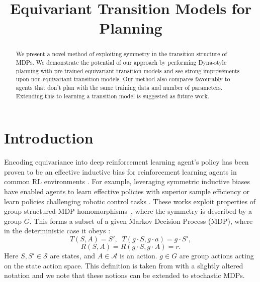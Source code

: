 \documentclass[mlabstract]{jmlr}
\title[Equivariant Planning]{Equivariant Transition Models for Planning}
\begin{document}
\maketitle

\begin{abstract}
	We present a novel method of exploiting symmetry in the transition structure of MDPs. We demonstrate the potential of our approach by performing Dyna-style planning with pre-trained equivariant transition models and see strong improvements upon non-equivariant transition models. Our method also compares favourably to agents that don't plan with the same training data and number of parameters. Extending this to learning a transition model is suggested as future work.
\end{abstract}

\vspace{-15}
\section{Introduction}
\indent \indent Encoding equivariance into deep reinforcement learning agent's policy has been proven to be an effective inductive bias for reinforcement learning agents in common RL environments \cite{van2020mdp}. For example, leveraging symmetric inductive biases have enabled agents to learn effective policies with superior sample efficiency \cite{van2020mdp, mondal2020group} or learn policies challenging robotic control tasks \cite{wang2022so2}. These works exploit properties of group structured MDP homomorphisms~\cite{ravindran2003smdp, ravindran2001symmetries}, where the symmetry is described by a group $G$. This forms a subset of a given Markov Decision Process (MDP), where in the deterministic case it obeys \cite{ravindran2001symmetries}:
\begin{equation}
	T(S, A) = S', \;\;
	T(g \cdot S, g \cdot a) = g \cdot S',
	\label{eq:gs_mdp}
\end{equation}
\begin{equation}
	R(S, A) = R(g \cdot S, g \cdot A) = r.
	\label{eq:gs_mdp_rw}
\end{equation}
Here $S, S' \in \mathcal{S}$ are states, and $A \in \mathcal{A}$ is an action. $g \in G$ are group actions acting on the state action space. This definition is taken from \cite{van2020mdp} with a slightly altered notation and we note that these notions can be extended to stochastic MDPs.
\end{document}
